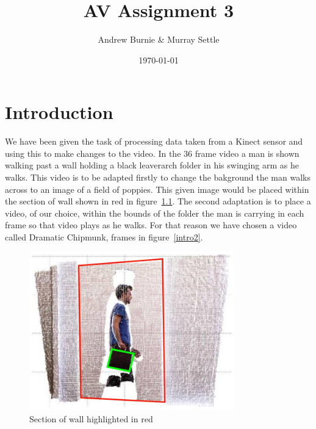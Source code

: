 \documentclass[parskip]{cs4rep}
\begin{document}
\title{AV Assignment 3}

\author{Andrew Burnie & Murray Settle}



\date{\today}


\maketitle

\tableofcontents



\chapter{Introduction}

We have been given the task of processing data taken from a Kinect \cite{Kinect} sensor and using this to make changes to the video. In the 36 frame video a man is shown walking past a wall holding a black leaverarch folder in his swinging arm as he walks. This video is to be adapted firstly to change the bakground the man walks across to an image of a field of poppies. This given image would be placed within the section of wall shown in red in figure~\ref{intro1}. The second adaptation is to place a video, of our choice, within the bounds of the folder the man is carrying in each frame so that video plays as he walks. For that reason we have chosen a video called Dramatic Chipmunk, frames in figure~\ref{intro2}.

\begin{figure}[H]
\centering
\includegraphics[width=3.5in]{IntroImage1.jpg}
\caption{Section of wall highlighted in red}
\label{intro1}
\end{figure}
\end{document}
